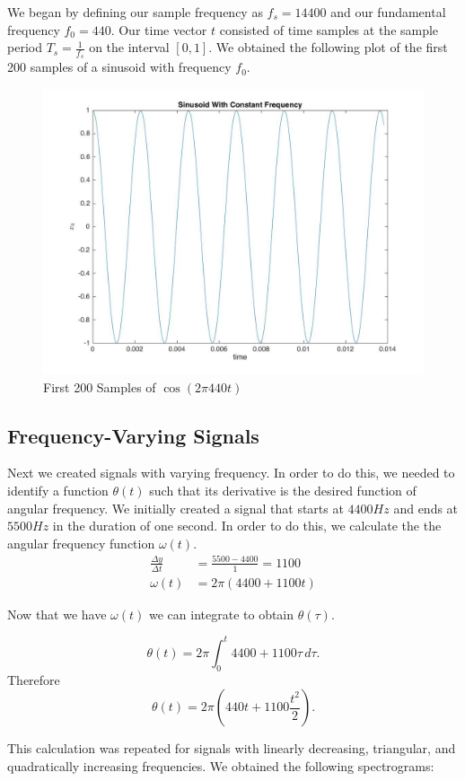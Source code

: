\documentclass{article}
\begin{document}
We began by defining our sample frequency as $f_s = 14400$ and our fundamental frequency $f_0 = 440.$ Our time vector $t$ consisted of time samples at the sample period $T_s = \frac{1}{f_s}$ on the interval $[0,1]$. We obtained the following plot of the first 200 samples of a sinusoid with frequency $f_0$.
\begin{figure}
	\centering
		\includegraphics[width =0.8\linewidth, height = 0.3\textheight]{part2x0.jpg}
	\caption{First 200 Samples of $\cos(2 \pi 440 t)$}
\end{figure}

\FloatBarrier
\subsection {Frequency-Varying Signals}
Next we created signals with varying frequency. In order to do this, we needed to identify a function $\theta(t)$ such that its derivative is the desired function of angular frequency. We initially created a signal that starts at $4400 \si{Hz}$ and ends at $5500 \si{Hz}$ in the duration of one second. In order to do this, we calculate the the angular frequency function $\omega(t)$. 
\begin{align*}
\frac{\Delta y}{\Delta t} &= \frac{5500 - 4400}{1} = 1100 \\
\omega(t) &= 2\pi(4400 + 1100t)
\end{align*}

Now that we have $\omega(t)$ we can integrate to obtain $\theta(\tau)$.

$$ \theta(t) = 2\pi \int_{0}^{t} 4400 + 1100\tau  \,d \tau.$$ Therefore
$$\theta(t) = 2 \pi (440t + 1100 \frac{t^2}{2}).$$

This calculation was repeated for signals with linearly decreasing, triangular, and quadratically increasing frequencies. We obtained the following spectrograms:
\end{document}
